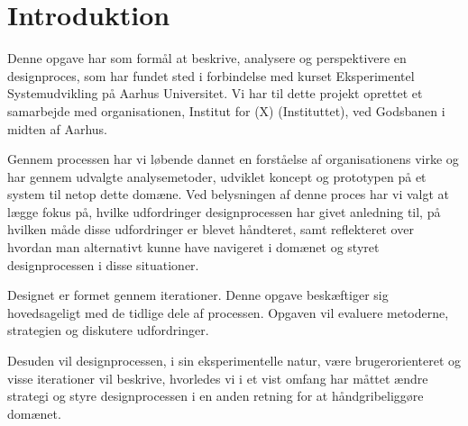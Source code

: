 \chapter{Introduktion}\label{marker}
Denne opgave har som formål at beskrive, analysere og perspektivere en designproces, som har fundet sted i forbindelse med kurset Eksperimentel Systemudvikling på Aarhus Universitet. 
Vi har til dette projekt oprettet et samarbejde med organisationen, Institut for (X) (Instituttet), ved Godsbanen i midten af Aarhus.

Gennem processen har vi løbende dannet en forståelse af organisationens virke og har gennem udvalgte analysemetoder, udviklet koncept og prototypen på et system til netop dette domæne.
Ved belysningen af denne proces har vi valgt at lægge fokus på, hvilke udfordringer designprocessen har givet anledning til, på hvilken måde disse udfordringer er blevet håndteret, samt reflekteret over hvordan man alternativt kunne have navigeret i domænet og styret designprocessen i disse situationer.

Designet er formet gennem iterationer. Denne opgave beskæftiger sig hovedsageligt med de tidlige dele af processen. Opgaven vil evaluere metoderne, strategien og diskutere udfordringer.

Desuden vil designprocessen, i sin eksperimentelle natur, være brugerorienteret og visse iterationer vil beskrive, hvorledes vi i et vist omfang har måttet ændre strategi og styre designprocessen i en anden retning for at håndgribeliggøre domænet.

